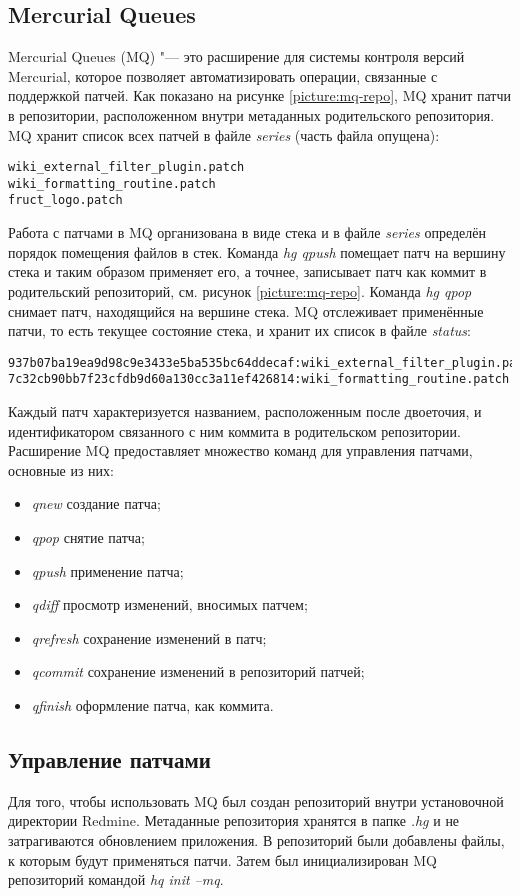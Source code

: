 \subsection{Mercurial Queues}
Mercurial Queues (MQ) \cite{mq} "--- это расширение для системы контроля версий
Mercurial, которое позволяет автоматизировать операции, связанные с поддержкой
патчей. Как показано на рисунке \ref{picture:mq-repo}, MQ хранит патчи в
репозитории, расположенном внутри метаданных родительского репозитория. MQ
хранит список всех патчей в файле \textit{series} (часть файла опущена):
\small{\begin{lstlisting}
wiki_external_filter_plugin.patch
wiki_formatting_routine.patch
fruct_logo.patch
\end{lstlisting}}
Работа с патчами в MQ организована в виде стека и в файле \textit{series}
определён порядок помещения файлов в стек. Команда \textit{hg qpush} помещает
патч на вершину стека и таким образом применяет его, а точнее, записывает патч
как коммит в родительский репозиторий, см. рисунок \ref{picture:mq-repo}.
Команда \textit{hg qpop} снимает патч, находящийся на вершине стека. MQ
отслеживает применённые патчи, то есть текущее состояние стека, и хранит их
список в файле \textit{status}:
\small{\begin{lstlisting}
937b07ba19ea9d98c9e3433e5ba535bc64ddecaf:wiki_external_filter_plugin.patch
7c32cb90bb7f23cfdb9d60a130cc3a11ef426814:wiki_formatting_routine.patch
\end{lstlisting}}
Каждый патч характеризуется названием, расположенным после двоеточия, и
идентификатором связанного с ним коммита в родительском репозитории.
Расширение MQ предоставляет множество команд для управления патчами, основные
из них:
\begin{itemize}
  \item \textit{qnew} создание патча;
  \item \textit{qpop} снятие патча;
  \item \textit{qpush} применение патча;
  \item \textit{qdiff} просмотр изменений, вносимых патчем;
  \item \textit{qrefresh} сохранение изменений в патч;
  \item \textit{qcommit} сохранение изменений в репозиторий патчей;
  \item \textit{qfinish} оформление патча, как коммита.
\end{itemize}

\subsection{Управление патчами}
Для того, чтобы использовать MQ был создан репозиторий внутри
установочной директории Redmine. Метаданные репозитория хранятся в папке
\textit{.hg} и не затрагиваются обновлением приложения. В репозиторий
были добавлены файлы, к которым будут применяться патчи. Затем был
инициализирован MQ репозиторий командой \textit{hq init --mq}.

